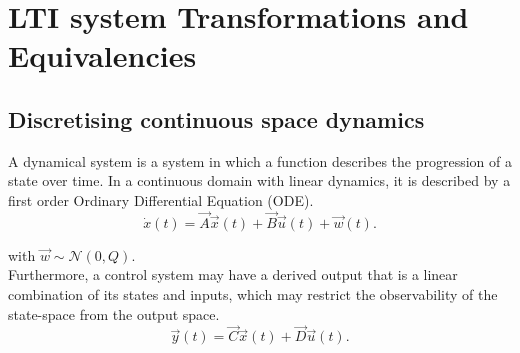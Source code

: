 \documentclass[runningheads,a4paper]{llncs}
\begin{document}
\newpage


  

\newpage
\appendix
\section{LTI system Transformations and Equivalencies} \label{sec:appendix}

\subsection{Discretising continuous space dynamics}

A dynamical system is a system in which a function describes the progression of a state over time. 
In a continuous domain with linear dynamics, it is described by a first order Ordinary Differential Equation (ODE).
\begin{equation}
\dot{x}(t)=\vec{A}\vec{x}(t)+\vec{B}\vec{u}(t) +\vec{w}(t).
\label{eq:dynamical}
\end{equation}

\noindent with $\vec{w} \sim \mathcal{N}(0,Q)$.\\
Furthermore, a control system may have a derived output that is a linear combination of its states and inputs, 
which may restrict the observability of the state-space from the output space.
\begin{equation}
\vec{y}(t)=\vec{C}\vec{x}(t)+\vec{D}\vec{u}(t).
\end{equation}
\end{document}
